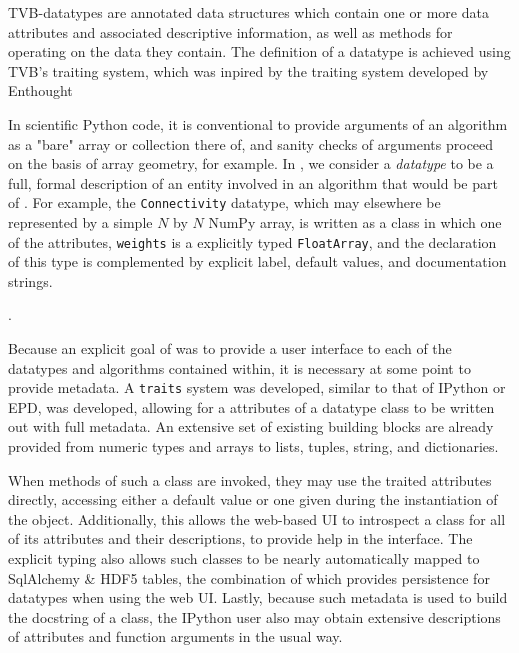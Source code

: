  TVB-datatypes are annotated data structures which
contain one or more data attributes and associated descriptive information, as
well as methods for operating on the data they contain. The definition of a
datatype is achieved using TVB's traiting system, which was inpired by the
traiting system developed by Enthought \cite{Enthought_2001} 



In scientific Python code, it is conventional to provide arguments
of an algorithm as a "bare" array or collection there of, and sanity
checks of arguments proceed on the basis of array geometry, for example.
In \TVB, we consider a \textit{datatype} to be a full, formal description of 
an entity involved in an algorithm that would be part of \TVB. 
For example, the \texttt{Connectivity} datatype, which may elsewhere
be represented by a simple $N$ by $N$ NumPy array, is written as a class
in which one of the attributes, \texttt{weights} is a explicitly typed 
\texttt{FloatArray}, and the declaration of this type is complemented by
explicit label, default values, and documentation strings. 

.

Because an explicit goal of \TVB was to provide a user interface to each of the
datatypes and algorithms contained within, it is necessary at some point to
provide metadata. A \texttt{traits} system was developed, similar to that of
IPython or EPD, was developed, allowing for a attributes of a datatype class to
be written out with full metadata. An extensive set of existing building 
blocks are already provided from numeric types and arrays to lists, tuples, 
string, and dictionaries.


 When methods of such a class are invoked,
they may use the traited attributes directly, accessing either a default value
or one given during the instantiation of the object. Additionally, this allows
the web-based UI to introspect a class for all of its attributes and their
descriptions, to provide help in the interface. The explicit typing also allows
such classes to be nearly automatically mapped to SqlAlchemy \& HDF5 tables,
the combination of which provides persistence for datatypes when using the web
UI.  Lastly, because such metadata is used to build the docstring of a class,
the IPython user also may obtain extensive descriptions of attributes and
function arguments in the usual way. 

